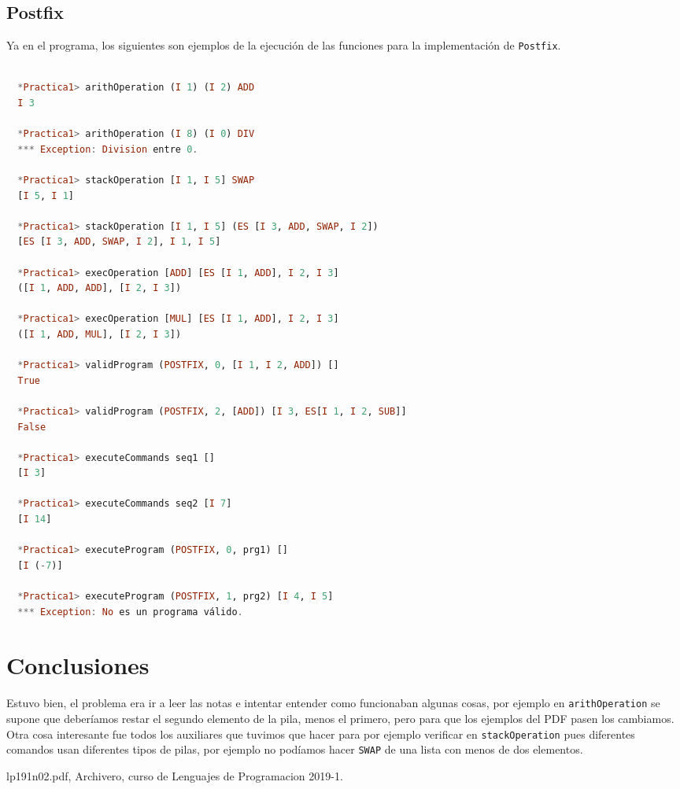 \documentclass[spanish,12pt,letterpaper]{article}
\begin{document}
\subsection{Postfix}
Ya en el programa, los siguientes son ejemplos de la ejecución de las funciones
para la implementación de \texttt{Postfix}.
\begin{lstlisting}[language=Haskell]

  *Practica1> arithOperation (I 1) (I 2) ADD
  I 3

  *Practica1> arithOperation (I 8) (I 0) DIV
  *** Exception: Division entre 0.

  *Practica1> stackOperation [I 1, I 5] SWAP
  [I 5, I 1]

  *Practica1> stackOperation [I 1, I 5] (ES [I 3, ADD, SWAP, I 2])
  [ES [I 3, ADD, SWAP, I 2], I 1, I 5]

  *Practica1> execOperation [ADD] [ES [I 1, ADD], I 2, I 3]
  ([I 1, ADD, ADD], [I 2, I 3])

  *Practica1> execOperation [MUL] [ES [I 1, ADD], I 2, I 3]
  ([I 1, ADD, MUL], [I 2, I 3])

  *Practica1> validProgram (POSTFIX, 0, [I 1, I 2, ADD]) []
  True

  *Practica1> validProgram (POSTFIX, 2, [ADD]) [I 3, ES[I 1, I 2, SUB]]
  False

  *Practica1> executeCommands seq1 []
  [I 3]

  *Practica1> executeCommands seq2 [I 7]
  [I 14]

  *Practica1> executeProgram (POSTFIX, 0, prg1) []
  [I (-7)]

  *Practica1> executeProgram (POSTFIX, 1, prg2) [I 4, I 5]
  *** Exception: No es un programa válido.

\end{lstlisting}
\section{Conclusiones}

Estuvo bien, el problema era ir a leer las notas e intentar entender como
funcionaban algunas cosas, por ejemplo en \texttt{arithOperation} se supone que
deberíamos restar el segundo elemento de la pila, menos el primero, pero para
que los ejemplos del PDF pasen los cambiamos.\\
Otra cosa interesante fue todos los auxiliares que tuvimos que hacer para por
ejemplo verificar en \texttt{stackOperation} pues diferentes comandos usan
diferentes tipos de pilas, por ejemplo no podíamos hacer \texttt{SWAP} de una lista con
menos de dos elementos.


\begin{thebibliography}{9}

  lp191n02.pdf, Archivero, curso de Lenguajes de Programacion 2019-1.
\end{thebibliography}
\end{document}
